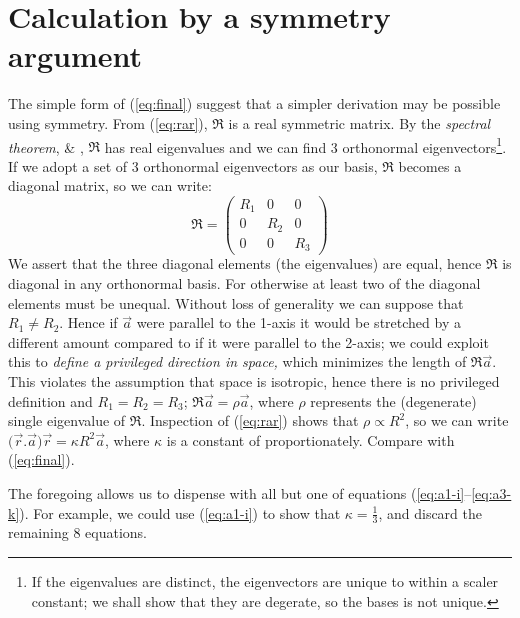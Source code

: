 \documentclass[]{article}
\begin{document}
\section{Calculation by a symmetry argument}\label{sect:symmetry}
The simple form of (\ref{eq:final}) suggest that a simpler derivation may be possible using symmetry. From (\ref{eq:rar}), $\mathfrak{R}$ is a real symmetric matrix. By the \emph{spectral theorem}, \cite{spectral-theorem} \& \cite{bellman1970}, $\mathfrak{R}$ has real eigenvalues and we can find 3 orthonormal eigenvectors\footnote{If the eigenvalues are distinct, the eigenvectors are unique to within a scaler constant; we shall show that they are degerate, so the bases is not unique.}. If we adopt a set of 3 orthonormal eigenvectors as our basis, $\mathfrak{R}$ becomes a diagonal matrix, so we can write:
\[\mathfrak{R}= 
\begin{pmatrix}
R_1 & 0 & 0 \\
0 & R_2 & 0 \\
0 & 0 & R_3
\end{pmatrix}
\]
We assert that the three diagonal elements (the eigenvalues) are equal, hence $\mathfrak{R}$ is diagonal in any orthonormal basis. For otherwise at least two of the diagonal elements must be unequal. Without loss of generality we can suppose that $R_1 \neq R_2$. Hence if $\vec{a}$ were parallel to the 1-axis it would be stretched by a different amount compared to if it were parallel to the 2-axis; we could exploit this to \emph{define a privileged direction in space,} which minimizes the length of $\mathfrak{R}\vec{a}$. This violates the assumption that space is isotropic, hence there is no privileged definition and $R_1=R_2=R_3$; $\mathfrak{R}\vec{a}=\rho\vec{a}$, where $\rho$ represents the (degenerate) single eigenvalue of $\mathfrak{R}$. Inspection of (\ref{eq:rar}) shows that $\rho \propto R^2$, so we can write $\big(\vec{r}.\vec{a}\big)\vec{r}=\kappa R^2 \vec{a}$, where $\kappa$ is a constant of proportionately. Compare with (\ref{eq:final}).

The foregoing allows us to dispense with all but one of equations (\ref{eq:a1-i}--\ref{eq:a3-k}). For example, we could use (\ref{eq:a1-i}) to show that $\kappa=\frac{1}{3}$, and discard the remaining 8 equations.
\end{document}
